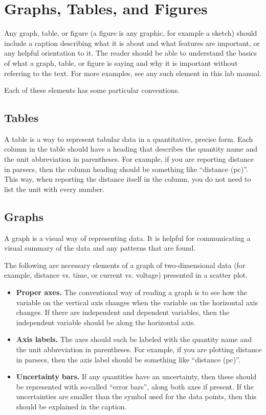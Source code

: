 \section{Graphs, Tables, and Figures}

Any graph, table, or figure (a figure is any graphic, for example a sketch) should include a caption describing what it is about and what features are important, or any helpful orientation to it. The reader should be able to understand the basics of what a graph, table, or figure is saying and why it is important without referring to the text. For more examples, see any such element in this lab manual.

Each of these elements has some particular conventions.

\subsection{Tables}

A table is a way to represent tabular data in a quantitative, precise form. Each column in the table should have a heading that describes the quantity name and the unit abbreviation in parentheses. For example, if you are reporting distance in parsecs, then the column heading should be something like ``distance (pc)''. This way, when reporting the distance itself in the column, you do not need to list the unit with every number.

\subsection{Graphs}

A graph is a visual way of representing data. It is helpful for communicating a visual summary of the data and any patterns that are found.

The following are necessary elements of a graph of two-dimensional data (for example, distance vs. time, or current vs. voltage) presented in a scatter plot.

\begin{itemize}
	\item \textbf{Proper axes.} The conventional way of reading a graph is to see how the variable on the vertical axis changes when the variable on the horizontal axis changes. If there are independent and dependent variables, then the independent variable should be along the horizontal axis.
	
	\item \textbf{Axis labels.} The axes should each be labeled with the quantity name and the unit abbreviation in parentheses. For example, if you are plotting distance in parsecs, then the axis label should be something like ``distance (pc)''.
	
	\item \textbf{Uncertainty bars.} If any quantities have an uncertainty, then these should be represented with so-called ``error bars'', along both axes if present. If the uncertainties are smaller than the symbol used for the data points, then this should be explained in the caption.

\end{itemize}

